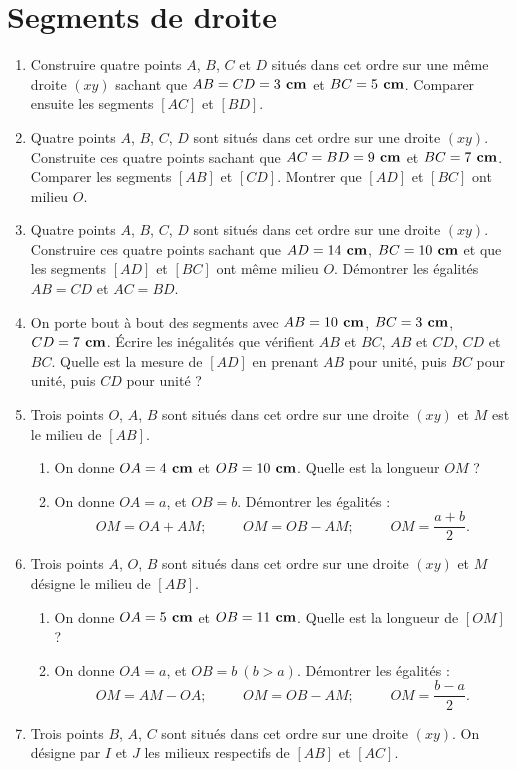 
\chapter{Segments de droite}
\begin{enumerate}
\item Construire quatre points $A$, $B$, $C$ et $D$ situés dans cet ordre sur une même droite $(xy)$ sachant que $AB=CD=3\textbf{ cm}$ et $BC = 5\textbf{ cm}$. Comparer ensuite les segments $[AC]$ et $[BD]$. 
\item Quatre points $A$, $B$, $C$, $D$ sont situés dans cet ordre sur une droite $(xy)$. Construite ces quatre points sachant que $AC=BD = 9 \textbf{ cm}$ et $BC = 7\textbf{ cm}$. Comparer les segments $[AB]$ et $[CD]$. Montrer que $[AD]$ et $[BC]$ ont milieu $O$. 
\item Quatre points $A$, $B$, $C$, $D$ sont situés dans cet ordre sur une droite $(xy)$. Construire ces quatre points sachant que $AD= 14\textbf{ cm}$, $BC = 10\textbf{ cm}$ et que les segments $[AD]$ et $[BC]$ ont même milieu $O$. Démontrer les égalités $AB=CD$ et $AC = BD$. 
\item On porte bout à bout des segments avec $AB = 10\textbf{ cm}$, $BC=3\textbf{ cm}$, $CD=7\textbf{ cm}$. Écrire les inégalités que vérifient $AB$ et $BC$, $AB$ et $CD$, $CD$ et $BC$. Quelle est la mesure de $[AD]$ en prenant $AB$ pour unité, puis $BC$ pour unité, puis $CD$ pour unité ? 
\item Trois points $O$, $A$, $B$ sont situés dans cet ordre sur une 
droite $(xy)$ et $M$ est le milieu de $[AB]$. \begin{enumerate}
\item On donne $OA = 4\textbf{ cm}$ et $OB = 10\textbf{ cm}$. Quelle est la longueur $OM$ ? 
\item On donne $OA = a$, et $OB = b$. Démontrer les égalités : 
\[ OM = OA + AM; \phantom{meow} OM = OB - AM;\phantom{meow} OM = \frac{a+b}2.\]
\end{enumerate}
\item Trois points $A$, $O$, $B$ sont situés dans cet ordre sur une droite $(xy)$ et 
$M$ désigne le milieu de $[AB]$. \begin{enumerate}
\item On donne $OA=5\textbf{ cm}$ et $OB = 11\textbf{ cm}$. Quelle est la longueur de $[OM]$ ? 
\item On donne $OA = a$, et $OB = b\ (b>a)$. Démontrer les égalités : 
\[ OM = AM - OA ; \phantom{meow} OM = OB-AM; \phantom{meow} OM = \frac{b-a}2.\]
\end{enumerate}
\item Trois points $B$, $A$, $C$ sont situés dans cet ordre sur une droite $(xy)$. On désigne par $I$ et $J$ les milieux respectifs de $[AB]$ et $[AC]$. 

\end{enumerate}
